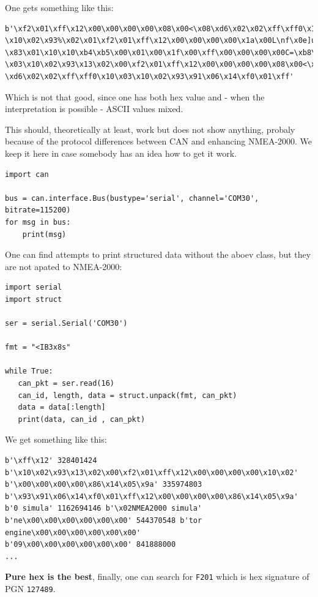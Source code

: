\documentclass[11pt]{article}
\begin{document}
    One gets something like this:

\begin{verbatim}
b'\xf2\x01\xff\x12\x00\x00\x00\x00\x08\x00<\x08\xd6\x02\x02\xff\xff0\x10\x03
\x10\x02\x93%\x02\x01\xf2\x01\xff\x12\x00\x00\x00\x00\x1a\x00L\nf\x0e]u2\x05
\x83\x01\x10\x10\xb4\xb5\x00\x01\x00\x1f\x00\xff\x00\x00\x00\x00C=\xb8\x10
\x03\x10\x02\x93\x13\x02\x00\xf2\x01\xff\x12\x00\x00\x00\x00\x08\x00<\x08
\xd6\x02\x02\xff\xff0\x10\x03\x10\x02\x93\x91\x06\x14\xf0\x01\xff'
\end{verbatim}

Which is not that good, since one has both hex value and - when the
interpretation is possible - ASCII values mixed.

    This should, theoretically at least, work but does not show anything,
probaly because of the protocol differences between CAN and enhancing
NMEA-2000. We keep it here in case somebody has an idea how to get it
work.

\begin{verbatim}
import can

bus = can.interface.Bus(bustype='serial', channel='COM30', bitrate=115200)
for msg in bus:
    print(msg)
\end{verbatim}

    One can find attempts to print structured data without the aboev class,
but they are not apated to NMEA-2000:

    \begin{verbatim}
import serial
import struct

ser = serial.Serial('COM30')

fmt = "<IB3x8s"

while True:
   can_pkt = ser.read(16)
   can_id, length, data = struct.unpack(fmt, can_pkt)
   data = data[:length]
   print(data, can_id , can_pkt)
\end{verbatim}

    We get something like this:

\begin{verbatim}
b'\xff\x12' 328401424 b'\x10\x02\x93\x13\x02\x00\xf2\x01\xff\x12\x00\x00\x00\x00\x10\x02'
b'\x00\x00\x00\x00\x86\x14\x05\x9a' 335974803 b'\x93\x91\x06\x14\xf0\x01\xff\x12\x00\x00\x00\x00\x86\x14\x05\x9a'
b'0 simula' 1162694146 b'\x02NMEA2000 simula'
b'ne\x00\x00\x00\x00\x00\x00' 544370548 b'tor engine\x00\x00\x00\x00\x00\x00'
b'09\x00\x00\x00\x00\x00\x00' 841888000
...
\end{verbatim}

    \textbf{Pure hex is the best}, finally, one can search for \texttt{F201}
which is hex signature of PGN \texttt{127489}.
\end{document}
